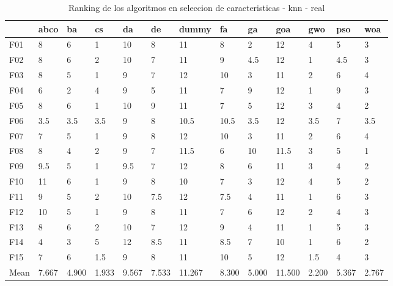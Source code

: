 \begin{table}
    \centering
    \begin{adjustbox}{width=\linewidth}
        \begin{tabular}{lllllllllllll}
            \toprule
            {}   & abco  & ba    & cs    & da    & de    & dummy  & fa    & ga    & goa    & gwo   & pso   & woa   \\
            \midrule
            F01  & 8     & 6     & 1     & 10    & 8     & 11     & 8     & 2     & 12     & 4     & 5     & 3     \\
            F02  & 8     & 6     & 2     & 10    & 7     & 11     & 9     & 4.5   & 12     & 1     & 4.5   & 3     \\
            F03  & 8     & 5     & 1     & 9     & 7     & 12     & 10    & 3     & 11     & 2     & 6     & 4     \\
            F04  & 6     & 2     & 4     & 9     & 5     & 11     & 7     & 9     & 12     & 1     & 9     & 3     \\
            F05  & 8     & 6     & 1     & 10    & 9     & 11     & 7     & 5     & 12     & 3     & 4     & 2     \\
            F06  & 3.5   & 3.5   & 3.5   & 9     & 8     & 10.5   & 10.5  & 3.5   & 12     & 3.5   & 7     & 3.5   \\
            F07  & 7     & 5     & 1     & 9     & 8     & 12     & 10    & 3     & 11     & 2     & 6     & 4     \\
            F08  & 8     & 4     & 2     & 9     & 7     & 11.5   & 6     & 10    & 11.5   & 3     & 5     & 1     \\
            F09  & 9.5   & 5     & 1     & 9.5   & 7     & 12     & 8     & 6     & 11     & 3     & 4     & 2     \\
            F10  & 11    & 6     & 1     & 9     & 8     & 10     & 7     & 3     & 12     & 4     & 5     & 2     \\
            F11  & 9     & 5     & 2     & 10    & 7.5   & 12     & 7.5   & 4     & 11     & 1     & 6     & 3     \\
            F12  & 10    & 5     & 1     & 9     & 8     & 11     & 7     & 6     & 12     & 2     & 4     & 3     \\
            F13  & 8     & 6     & 2     & 10    & 7     & 12     & 9     & 4     & 11     & 1     & 5     & 3     \\
            F14  & 4     & 3     & 5     & 12    & 8.5   & 11     & 8.5   & 7     & 10     & 1     & 6     & 2     \\
            F15  & 7     & 6     & 1.5   & 9     & 8     & 11     & 10    & 5     & 12     & 1.5   & 4     & 3     \\
            Mean & 7.667 & 4.900 & 1.933 & 9.567 & 7.533 & 11.267 & 8.300 & 5.000 & 11.500 & 2.200 & 5.367 & 2.767 \\
            \bottomrule
        \end{tabular}
    \end{adjustbox}
    \caption{Ranking de los algoritmos en seleccion de caracteristicas - knn - real}
    \label{tab:ranking_sel_rate_real_knn}
\end{table}

